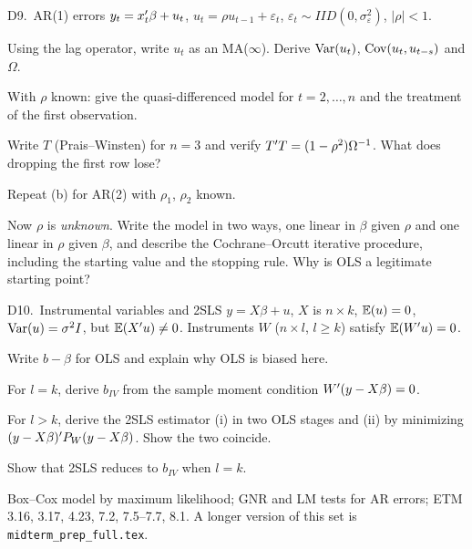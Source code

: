 \documentclass[11pt]{article}
\newcommand{\newtag}{\tcbox[on line, colback=qnavy!60, colframe=qnavy!60, coltext=white,
  boxsep=1pt, left=3pt, right=3pt, top=0pt, bottom=0pt, arc=1.5pt]{\scriptsize\sffamily\bfseries NEW}}
\begin{document}
\begin{qbox}{D9.\ AR(1) errors}{\newtag}
$y_{t} = x_{t}^{\prime}\beta + u_{t}$, $u_{t} = \rho u_{t-1} + \varepsilon_{t}$,
$\varepsilon_{t} \sim IID(0,\sigma_{\varepsilon}^{2})$, $|\rho| < 1$.
\begin{flatlist}
  \item[(a)] Using the lag operator, write $u_{t}$ as an MA($\infty$). Derive $\operatorname{Var}(u_{t})$,
        $\operatorname{Cov}(u_{t},u_{t-s})$ and $\Omega$.
  \item[(b)] With $\rho$ known: give the quasi-differenced model for $t = 2,\dots,n$ and the
        treatment of the first observation.
  \item[(c)] Write $T$ (Prais--Winsten) for $n = 3$ and verify $T^{\prime} T = (1-\rho^{2})\Omega^{-1}$.
        What does dropping the first row lose?
  \item[(d)] Repeat (b) for AR(2) with $\rho_{1}$, $\rho_{2}$ known.
  \item[(e)] Now $\rho$ is \emph{unknown}. Write the model in two ways, one linear in $\beta$
        given $\rho$ and one linear in $\rho$ given $\beta$, and describe the Cochrane--Orcutt
        iterative procedure, including the starting value and the stopping rule. Why is OLS a
        legitimate starting point?
\end{flatlist}
\end{qbox}

\begin{qbox}{D10.\ Instrumental variables and 2SLS}{\newtag}
$y = X\beta + u$, $X$ is $n \times k$, $\mathbb{E}(u) = 0$, $\operatorname{Var}(u) = \sigma^{2}I$, but $\mathbb{E}(X^{\prime} u) \neq 0$.
Instruments $W$ ($n \times l$, $l \ge k$) satisfy $\mathbb{E}(W^{\prime} u) = 0$.
\begin{flatlist}
  \item[(a)] Write $b - \beta$ for OLS and explain why OLS is biased here.
  \item[(b)] For $l = k$, derive $b_{IV}$ from the sample moment condition $W^{\prime}(y - X\beta) = 0$.
  \item[(c)] For $l > k$, derive the 2SLS estimator (i) in two OLS stages and (ii) by minimizing
        $(y - X\beta)^{\prime} P_{W}(y - X\beta)$. Show the two coincide.
  \item[(d)] Show that 2SLS reduces to $b_{IV}$ when $l = k$.
\end{flatlist}
\end{qbox}

{\small Box--Cox model by maximum likelihood; GNR and LM tests for AR errors; ETM 3.16,
3.17, 4.23, 7.2, 7.5--7.7, 8.1. A longer version of this set is
\texttt{midterm\_prep\_full.tex}.}
\end{document}
